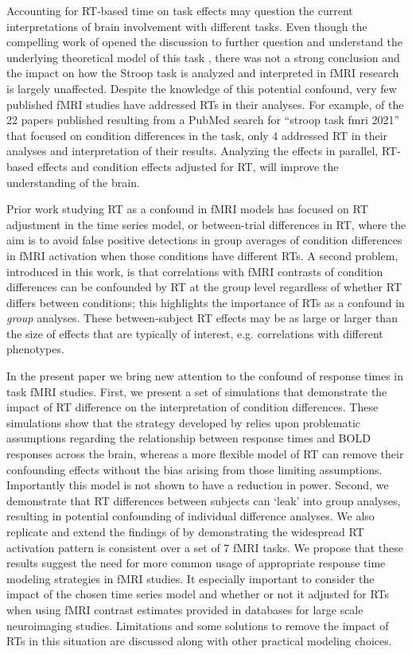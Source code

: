 \documentclass[titlepage,12pt] {article}
\begin{document}
Accounting for RT-based time on task effects may question the current interpretations of brain involvement with different tasks.  Even though the compelling work of \citet{grinband_dorsal_2011} opened the discussion to further question and understand the underlying theoretical model of this task \citep{yeung_errors_2011, brown_medial_2011, alexander_medial_2011, brown_medial_2011}, there was not a strong conclusion and the impact on how the Stroop task is analyzed and interpreted in fMRI research is largely unaffected. Despite the knowledge of this potential confound, very few published fMRI studies have addressed RTs in their analyses.  For example, of the 22 papers published resulting from a PubMed search for ``stroop task fmri 2021'' that focused on condition differences in the task, only 4 addressed RT in their analyses and interpretation of their results. Analyzing the effects in parallel, RT-based effects and condition effects adjusted for RT, will improve the understanding of the brain.

Prior work studying RT as a confound in fMRI models has focused on RT adjustment in the time series model, or between-trial differences in RT, where the aim is to avoid false positive detections in group averages of condition differences in fMRI activation when those conditions have different RTs.  A second problem, introduced in this work, is that correlations with fMRI contrasts of condition differences can be confounded by RT at the group level regardless of whether RT differs between conditions; this highlights the importance of RTs as a confound in \emph{group} analyses.  These between-subject RT effects may be as large or larger than the size of effects that are typically of interest, e.g. correlations with different phenotypes.  


In the present paper we bring new attention to the confound of response times in task fMRI studies.  First, we present a set of simulations that demonstrate the impact of RT difference on the interpretation of condition differences.  These simulations show that the strategy developed by \citet{grinband_detection_2008} relies upon problematic assumptions regarding the relationship between response times and BOLD responses across the brain, whereas a more flexible model of RT can remove their confounding effects without the bias arising from those limiting assumptions.  Importantly this model is not shown to have a reduction in power.  Second, we demonstrate that RT differences between subjects can `leak' into group analyses, resulting in potential confounding of individual difference analyses. We also replicate and extend the findings of \citet{yarkoni_bold_2009} by demonstrating the widespread RT activation pattern is consistent over a set of 7 fMRI tasks. We propose that these results suggest the need for more common usage of appropriate response time modeling strategies in fMRI studies.  It especially important to consider the impact of the chosen time series model and whether or not it adjusted for RTs when using fMRI contrast estimates provided in databases for large scale neuroimaging studies.  Limitations and some solutions to remove the impact of RTs in this situation are discussed along with other practical modeling choices.
\end{document}
